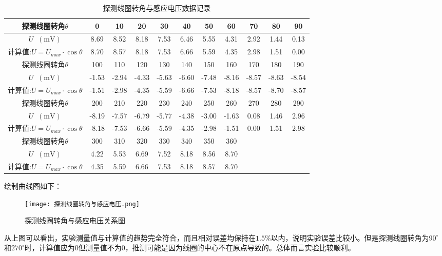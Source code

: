 \documentclass[11pt]{article}
\newcommand*{\unit}[1]{\mathop{}\!\mathrm{#1}}
\begin{document}
\begin{table}[H]
  \centering
  \caption{探测线圈转角与感应电压数据记录}
  \begin{tabular}{|c|c|c|c|c|c|c|c|c|c|c|}
      \hline
      探测线圈转角$\theta$&0&10&20&30&40&50&60&70&80&90\\
      \hline
      $U\unit{(mV)}$&8.69  & 8.52  & 8.18  & 7.53  & 6.46  & 5.55  & 4.31  & 2.92  & 1.44  & 0.13 \\
      \hline
      计算值:$U = U_{max} \cdot \cos \theta$&8.70  & 8.57  & 8.18  & 7.53  & 6.66  & 5.59  & 4.35  & 2.98  & 1.51  & 0.00  \\
      \hline
      探测线圈转角$\theta$&100&110&120&130&140&150&160&170&180&190\\
      \hline
      $U\unit{(mV)}$&-1.53  & -2.94  & -4.33  & -5.63  & -6.60  & -7.48  & -8.16  & -8.57  & -8.63  & -8.54  \\
      \hline
      计算值:$U = U_{max} \cdot \cos \theta$&-1.51  & -2.98  & -4.35  & -5.59  & -6.66  & -7.53  & -8.18  & -8.57  & -8.70  & -8.57  \\
      \hline
      探测线圈转角$\theta$&200&210&220&230&240&250&260&270&280&290\\
      \hline
      $U\unit{(mV)}$&-8.19  & -7.57  & -6.79  & -5.77  & -4.38  & -3.00  & -1.63  & 0.08  & 1.46  & 2.96  \\
      \hline
      计算值:$U = U_{max} \cdot \cos \theta$&-8.18  & -7.53  & -6.66  & -5.59  & -4.35  & -2.98  & -1.51  & 0.00  & 1.51  & 2.98  \\
      \hline
      探测线圈转角$\theta$&300&310&320&330&340&350&360&&&\\
      \hline
      $U\unit{(mV)}$&4.22  & 5.53  & 6.69  & 7.52  & 8.18  & 8.56  & 8.70  &&&\\
      \hline
      计算值:$U = U_{max} \cdot \cos \theta$&4.35  & 5.59  & 6.66  & 7.53  & 8.18  & 8.57  & 8.70&&&\\
      \hline
  \end{tabular}
\end{table}

绘制曲线图如下：

\begin{figure}[H]
  \centering
  \texttt{[image: 探测线圈转角与感应电压.png]}
  \caption{探测线圈转角与感应电压关系图}
\end{figure}

从上图可以看出，实验测量值与计算值的趋势完全符合，而且相对误差均保持在$1.5\%$以内，说明实验误差比较小。但是探测线圈转角为$90^\circ$和$270^\circ$时，计算值应为0但测量值不为0，推测可能是因为线圈的中心不在原点导致的。总体而言实验比较顺利。
\end{document}
